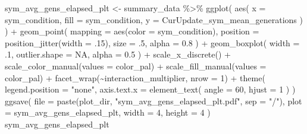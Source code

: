 \documentclass[
]{book}
\newenvironment{Shaded}{\begin{snugshade}}{\end{snugshade}}
\newcommand{\AttributeTok}[1]{\textcolor[rgb]{0.77,0.63,0.00}{#1}}
\newcommand{\ConstantTok}[1]{\textcolor[rgb]{0.00,0.00,0.00}{#1}}
\newcommand{\DecValTok}[1]{\textcolor[rgb]{0.00,0.00,0.81}{#1}}
\newcommand{\FloatTok}[1]{\textcolor[rgb]{0.00,0.00,0.81}{#1}}
\newcommand{\FunctionTok}[1]{\textcolor[rgb]{0.00,0.00,0.00}{#1}}
\newcommand{\NormalTok}[1]{#1}
\newcommand{\OtherTok}[1]{\textcolor[rgb]{0.56,0.35,0.01}{#1}}
\newcommand{\SpecialCharTok}[1]{\textcolor[rgb]{0.00,0.00,0.00}{#1}}
\newcommand{\StringTok}[1]{\textcolor[rgb]{0.31,0.60,0.02}{#1}}
\begin{document}
\begin{Shaded}
\begin{Highlighting}[]
\NormalTok{sym\_avg\_gens\_elapsed\_plt }\OtherTok{\textless{}{-}}\NormalTok{ summary\_data }\SpecialCharTok{\%\textgreater{}\%}
  \FunctionTok{ggplot}\NormalTok{(}
    \FunctionTok{aes}\NormalTok{(}
      \AttributeTok{x =}\NormalTok{ sym\_condition,}
      \AttributeTok{fill =}\NormalTok{ sym\_condition,}
      \AttributeTok{y =}\NormalTok{ CurUpdate\_sym\_mean\_generations}
\NormalTok{    )}
\NormalTok{  ) }\SpecialCharTok{+}
  \FunctionTok{geom\_point}\NormalTok{(}
    \AttributeTok{mapping =} \FunctionTok{aes}\NormalTok{(}\AttributeTok{color =}\NormalTok{ sym\_condition),}
    \AttributeTok{position =} \FunctionTok{position\_jitter}\NormalTok{(}\AttributeTok{width =}\NormalTok{ .}\DecValTok{15}\NormalTok{),}
    \AttributeTok{size =}\NormalTok{ .}\DecValTok{5}\NormalTok{,}
    \AttributeTok{alpha =} \FloatTok{0.8}
\NormalTok{  ) }\SpecialCharTok{+}
  \FunctionTok{geom\_boxplot}\NormalTok{(}
    \AttributeTok{width =}\NormalTok{ .}\DecValTok{1}\NormalTok{,}
    \AttributeTok{outlier.shape =} \ConstantTok{NA}\NormalTok{,}
    \AttributeTok{alpha =} \FloatTok{0.5}
\NormalTok{  ) }\SpecialCharTok{+}
  \FunctionTok{scale\_x\_discrete}\NormalTok{() }\SpecialCharTok{+}
  \FunctionTok{scale\_color\_manual}\NormalTok{(}\AttributeTok{values =}\NormalTok{ color\_pal) }\SpecialCharTok{+}
  \FunctionTok{scale\_fill\_manual}\NormalTok{(}\AttributeTok{values =}\NormalTok{ color\_pal) }\SpecialCharTok{+}
  \FunctionTok{facet\_wrap}\NormalTok{(}\SpecialCharTok{\textasciitilde{}}\NormalTok{interaction\_multiplier, }\AttributeTok{nrow =} \DecValTok{1}\NormalTok{) }\SpecialCharTok{+}
  \FunctionTok{theme}\NormalTok{(}
    \AttributeTok{legend.position =} \StringTok{"none"}\NormalTok{,}
    \AttributeTok{axis.text.x =} \FunctionTok{element\_text}\NormalTok{(}
      \AttributeTok{angle =} \DecValTok{60}\NormalTok{,}
      \AttributeTok{hjust =} \DecValTok{1}
\NormalTok{    )}
\NormalTok{  )}
\FunctionTok{ggsave}\NormalTok{(}
  \AttributeTok{file =} \FunctionTok{paste}\NormalTok{(plot\_dir, }\StringTok{"sym\_avg\_gens\_elapsed\_plt.pdf"}\NormalTok{, }\AttributeTok{sep =} \StringTok{"/"}\NormalTok{),}
  \AttributeTok{plot =}\NormalTok{ sym\_avg\_gens\_elapsed\_plt,}
  \AttributeTok{width =} \DecValTok{4}\NormalTok{,}
  \AttributeTok{height =} \DecValTok{4}
\NormalTok{)}
\NormalTok{sym\_avg\_gens\_elapsed\_plt}
\end{Highlighting}
\end{Shaded}
\end{document}

